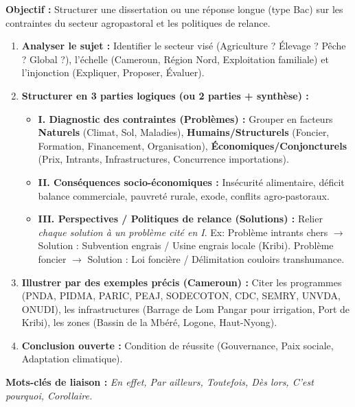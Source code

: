 \documentclass[11pt]{article}
\begin{document}
\begin{methode}
\textbf{Objectif :} Structurer une dissertation ou une réponse longue (type Bac) sur les contraintes du secteur agropastoral et les politiques de relance.
\begin{enumerate}
    \item \textbf{Analyser le sujet :} Identifier le secteur visé (Agriculture ? Élevage ? Pêche ? Global ?), l'échelle (Cameroun, Région Nord, Exploitation familiale) et l'injonction (Expliquer, Proposer, Évaluer).
    \item \textbf{Structurer en 3 parties logiques (ou 2 parties + synthèse) :}
    \begin{itemize}
        \item \textbf{I. Diagnostic des contraintes (Problèmes) :} Grouper en facteurs \textbf{Naturels} (Climat, Sol, Maladies), \textbf{Humains/Structurels} (Foncier, Formation, Financement, Organisation), \textbf{Économiques/Conjoncturels} (Prix, Intrants, Infrastructures, Concurrence importations).
        \item \textbf{II. Conséquences socio-économiques :} Insécurité alimentaire, déficit balance commerciale, pauvreté rurale, exode, conflits agro-pastoraux.
        \item \textbf{III. Perspectives / Politiques de relance (Solutions) :} Relier \emph{chaque solution à un problème cité en I}. Ex: Problème intrants chers $\to$ Solution : Subvention engrais / Usine engrais locale (Kribi). Problème foncier $\to$ Solution : Loi foncière / Délimitation couloirs transhumance.
    \end{itemize}
    \item \textbf{Illustrer par des exemples précis (Cameroun) :} Citer les programmes (PNDA, PIDMA, PARIC, PEAJ, SODECOTON, CDC, SEMRY, UNVDA, ONUDI), les infrastructures (Barrage de Lom Pangar pour irrigation, Port de Kribi), les zones (Bassin de la Mbéré, Logone, Haut-Nyong).
    \item \textbf{Conclusion ouverte :} Condition de réussite (Gouvernance, Paix sociale, Adaptation climatique).
\end{enumerate}
\textbf{Mots-clés de liaison :} \emph{En effet, Par ailleurs, Toutefois, Dès lors, C'est pourquoi, Corollaire.}
\end{methode}
\end{document}
